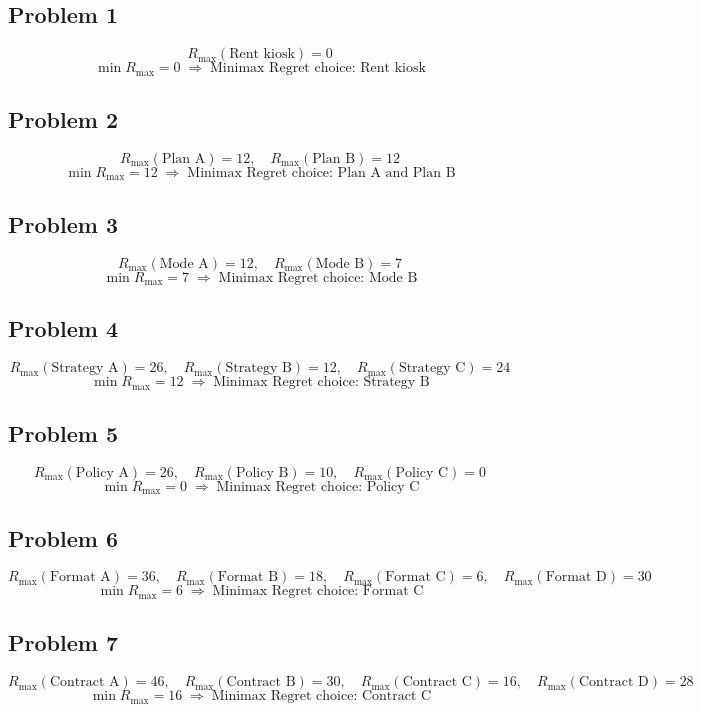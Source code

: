 \subsection*{Problem 1}
\[
R_{\max}(\text{Rent kiosk})=0
\]
\[
\min R_{\max}=0\;\Rightarrow\;\text{Minimax Regret choice: Rent kiosk}
\]

\subsection*{Problem 2}
\[
R_{\max}(\text{Plan A})=12,\quad R_{\max}(\text{Plan B})=12
\]
\[
\min R_{\max}=12\;\Rightarrow\;\text{Minimax Regret choice: Plan A and Plan B}
\]

\subsection*{Problem 3}
\[
R_{\max}(\text{Mode A})=12,\quad R_{\max}(\text{Mode B})=7
\]
\[
\min R_{\max}=7\;\Rightarrow\;\text{Minimax Regret choice: Mode B}
\]

\subsection*{Problem 4}
\[
R_{\max}(\text{Strategy A})=26,\quad R_{\max}(\text{Strategy B})=12,\quad R_{\max}(\text{Strategy C})=24
\]
\[
\min R_{\max}=12\;\Rightarrow\;\text{Minimax Regret choice: Strategy B}
\]

\subsection*{Problem 5}
\[
R_{\max}(\text{Policy A})=26,\quad R_{\max}(\text{Policy B})=10,\quad R_{\max}(\text{Policy C})=0
\]
\[
\min R_{\max}=0\;\Rightarrow\;\text{Minimax Regret choice: Policy C}
\]

\subsection*{Problem 6}
\[
R_{\max}(\text{Format A})=36,\quad R_{\max}(\text{Format B})=18,\quad R_{\max}(\text{Format C})=6,\quad R_{\max}(\text{Format D})=30
\]
\[
\min R_{\max}=6\;\Rightarrow\;\text{Minimax Regret choice: Format C}
\]

\subsection*{Problem 7}
\[
R_{\max}(\text{Contract A})=46,\quad R_{\max}(\text{Contract B})=30,\quad R_{\max}(\text{Contract C})=16,\quad R_{\max}(\text{Contract D})=28
\]
\[
\min R_{\max}=16\;\Rightarrow\;\text{Minimax Regret choice: Contract C}
\]

